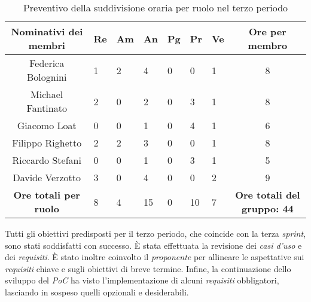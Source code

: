 \begin{table}[h!]
    \centering
    \renewcommand{\arraystretch}{1.5}
    \begin{tabularx}{\textwidth}{|c|X|X|X|X|X|X|c|}\hline
    \rowcolor[HTML]{FFD700} 
    \textbf{Nominativi dei membri} & \textbf{Re} & \textbf{Am} & \textbf{An} & \textbf{Pg} & \textbf{Pr} & \textbf{Ve} & \textbf{Ore per membro} \\ \hline
    Federica Bolognini  & 1 & 2 & 4 & 0 & 0 & 1 & 8 \\ \hline
    Michael Fantinato   & 2 & 0 & 2 & 0 & 3 & 1 & 8 \\ \hline
    Giacomo Loat        & 0 & 0 & 1 & 0 & 4 & 1 & 6 \\ \hline
    Filippo Righetto    & 2 & 2 & 3 & 0 & 0 & 1 & 8 \\ \hline
    Riccardo Stefani    & 0 & 0 & 1 & 0 & 3 & 1 & 5 \\ \hline
    Davide Verzotto     & 3 & 0 & 4 & 0 & 0 & 2 & 9 \\ \hline
    \rowcolor[HTML]{FFD700} 
    \textbf{Ore totali per ruolo} & 8 & 4 & 15 & 0 & 10 & 7 & \textbf{Ore totali del gruppo: 44} \\ \hline
    \end{tabularx}
    \caption{Preventivo della suddivisione oraria per ruolo nel terzo periodo}
\end{table}

Tutti gli obiettivi predisposti per il terzo periodo, che coincide con la terza \emph{sprint}, sono stati soddisfatti con successo.
È stata effettuata la revisione dei \emph{casi d’uso} e dei \emph{requisiti}. È stato inoltre coinvolto il \emph{proponente} per allineare le aspettative sui \emph{requisiti} chiave e sugli obiettivi di breve termine.
Infine, la continuazione dello sviluppo del \emph{PoC} ha visto l'implementazione di alcuni \emph{requisiti} obbligatori, lasciando in sospeso quelli opzionali e desiderabili.

\newpage
